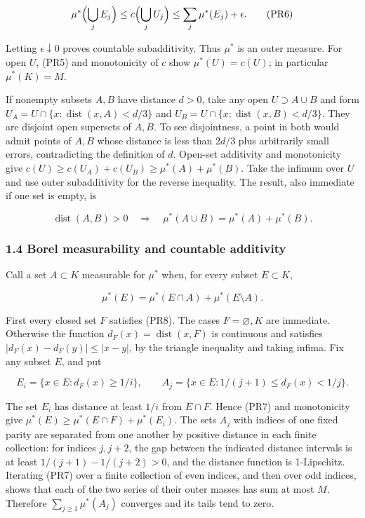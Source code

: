 \documentclass[
  11pt,
]{article}
\begin{document}
\[
\mu^*\Bigl(\bigcup_jE_j\Bigr)
\leq c\Bigl(\bigcup_jU_j\Bigr)
\leq\sum_j\mu^*(E_j)+\epsilon.
\tag{PR6}
\]

Letting \(\epsilon\downarrow0\) proves countable subadditivity. Thus
\(\mu^*\) is an outer measure. For open \(U\), (PR5) and monotonicity of
\(c\) show \(\mu^*(U)=c(U)\); in particular \(\mu^*(K)=M\).

If nonempty subsets \(A,B\) have distance \(d>0\), take any open
\(U\supset A\cup B\) and form
\(U_A=U\cap\{x:\operatorname{dist}(x,A)<d/3\}\) and
\(U_B=U\cap\{x:\operatorname{dist}(x,B)<d/3\}\). They are disjoint open
supersets of \(A,B\). To see disjointness, a point in both would admit
points of \(A,B\) whose distance is less than \(2d/3\) plus arbitrarily
small errors, contradicting the definition of \(d\). Open-set additivity
and monotonicity give \(c(U)\geq c(U_A)+c(U_B)\geq\mu^*(A)+\mu^*(B)\).
Take the infimum over \(U\) and use outer subadditivity for the reverse
inequality. The result, also immediate if one set is empty, is

\[
\operatorname{dist}(A,B)>0
\quad\Longrightarrow\quad
\mu^*(A\cup B)=\mu^*(A)+\mu^*(B).
\tag{PR7}
\]

\subsubsection{1.4 Borel measurability and countable
additivity}\label{borel-measurability-and-countable-additivity}

Call a set \(A\subset K\) measurable for \(\mu^*\) when, for every
subset \(E\subset K\),

\[
\mu^*(E)=\mu^*(E\cap A)+\mu^*(E\setminus A).
\tag{PR8}
\]

First every closed set \(F\) satisfies (PR8). The cases
\(F=\varnothing,K\) are immediate. Otherwise the function
\(d_F(x)=\operatorname{dist}(x,F)\) is continuous and satisfies
\(|d_F(x)-d_F(y)|\leq|x-y|\), by the triangle inequality and taking
infima. Fix any subset \(E\), and put

\[
E_i=\{x\in E:d_F(x)\geq1/i\},\qquad
A_j=\{x\in E:1/(j+1)\leq d_F(x)<1/j\}.
\tag{PR9}
\]

The set \(E_i\) has distance at least \(1/i\) from \(E\cap F\). Hence
(PR7) and monotonicity give \(\mu^*(E)\geq\mu^*(E\cap F)+\mu^*(E_i)\).
The sets \(A_j\) with indices of one fixed parity are separated from one
another by positive distance in each finite collection: for indices
\(j,j+2\), the gap between the indicated distance intervals is at least
\(1/(j+1)-1/(j+2)>0\), and the distance function is 1-Lipschitz.
Iterating (PR7) over a finite collection of even indices, and then over
odd indices, shows that each of the two series of their outer masses has
sum at most \(M\). Therefore \(\sum_{j\geq1}\mu^*(A_j)\) converges and
its tails tend to zero.
\end{document}
